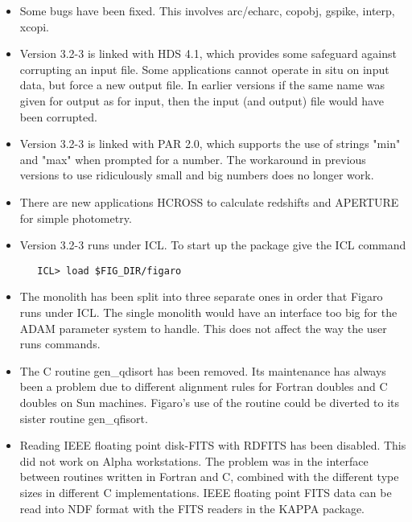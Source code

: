 \begin{itemize}
\item
   Some bugs have been fixed. This involves arc/echarc, copobj, gspike,
   interp, xcopi.

\item
   Version 3.2-3 is linked with HDS 4.1, which provides some safeguard
   against corrupting an input file. Some applications cannot operate in
   situ on input data, but force a new output file. In earlier versions
   if the same name was given for output as for input, then the input
   (and output) file would have been corrupted.

\item
   Version 3.2-3 is linked with PAR 2.0, which supports the use of
   strings "min" and "max" when prompted for a number. The workaround in
   previous versions to use ridiculously small and big numbers does no
   longer work.

\item
   There are new applications HCROSS to calculate redshifts and APERTURE
   for simple photometry.

\item
   Version 3.2-3 runs under ICL. To start up the package give the ICL
   command

\begin{verbatim}
   ICL> load $FIG_DIR/figaro
\end{verbatim}

\item
   The monolith has been split into three separate ones in order that
   Figaro runs under ICL. The single monolith would have an interface
   too big for the ADAM parameter system to handle. This does not affect
   the way the user runs commands.

\item
   The C routine gen\_qdisort has been removed. Its maintenance has
   always been a problem due to different alignment rules for Fortran
   doubles and C doubles on Sun machines. Figaro's use of the routine
   could be diverted to its sister routine gen\_qfisort.

\item
   Reading IEEE floating point disk-FITS with RDFITS has been disabled.
   This did not work on Alpha workstations. The problem was in the
   interface between routines written in Fortran and C, combined with
   the different type sizes in different C implementations. IEEE
   floating point FITS data can be read into NDF format with the FITS
   readers in the KAPPA package.


\end{itemize}
